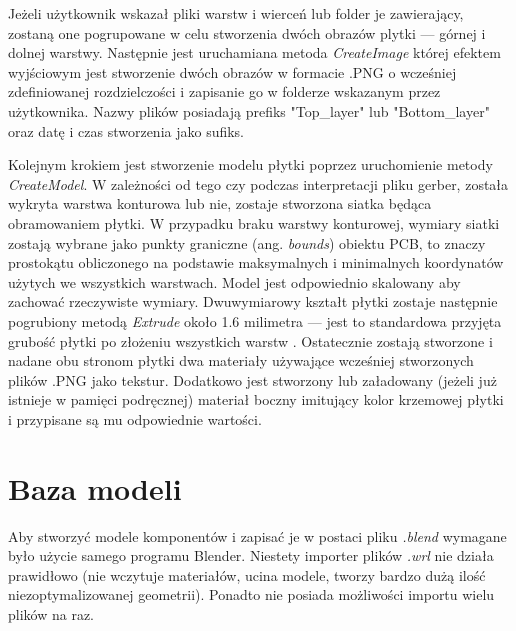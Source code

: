 \documentclass{xmgr}
\begin{document}
Jeżeli użytkownik wskazał pliki warstw i wierceń lub folder je zawierający, zostaną one pogrupowane w celu stworzenia dwóch obrazów plytki --- górnej i dolnej warstwy. Następnie jest uruchamiana metoda \emph{CreateImage} której efektem wyjściowym jest stworzenie dwóch obrazów w formacie .PNG o wcześniej zdefiniowanej rozdzielczości i zapisanie go w folderze wskazanym przez użytkownika. Nazwy plików posiadają prefiks "Top\_layer" lub "Bottom\_layer" oraz datę i czas stworzenia jako sufiks. 

Kolejnym krokiem jest stworzenie modelu płytki poprzez uruchomienie metody \emph{CreateModel}. W zależności od tego czy podczas interpretacji pliku gerber, została wykryta warstwa konturowa lub nie, zostaje stworzona siatka będąca obramowaniem płytki. W przypadku braku warstwy konturowej, wymiary siatki zostają wybrane jako punkty graniczne (ang. \emph{bounds}) obiektu PCB, to znaczy prostokątu obliczonego na podstawie maksymalnych i minimalnych koordynatów użytych we wszystkich warstwach. Model jest odpowiednio skalowany aby zachować rzeczywiste wymiary.
Dwuwymiarowy kształt płytki zostaje następnie pogrubiony metodą \emph{Extrude} około 1.6 milimetra --- jest to standardowa przyjęta grubość płytki po złożeniu wszystkich warstw \cite{Khandpur}.
Ostatecznie zostają stworzone i nadane obu stronom płytki dwa materiały używające wcześniej stworzonych plików .PNG jako tekstur. Dodatkowo jest stworzony lub załadowany (jeżeli już istnieje w pamięci podręcznej) materiał boczny imitujący kolor krzemowej płytki i przypisane są mu odpowiednie wartości.

\section {Baza modeli\label{wrl}}

Aby stworzyć modele komponentów i zapisać je w postaci pliku \emph{.blend} wymagane było użycie samego programu Blender. Niestety importer plików \emph{.wrl} nie działa prawidłowo (nie wczytuje materiałów, ucina modele, tworzy bardzo dużą ilość niezoptymalizowanej geometrii). Ponadto nie posiada możliwości importu wielu plików na raz.
\end{document}
